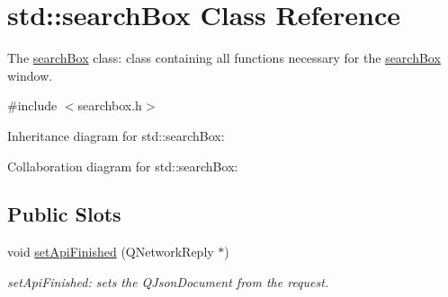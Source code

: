 \hypertarget{classstd_1_1searchBox}{}\section{std\+:\+:search\+Box Class Reference}
\label{classstd_1_1searchBox}


The \hyperlink{classstd_1_1searchBox}{search\+Box} class\+: class containing all functions necessary for the \hyperlink{classstd_1_1searchBox}{search\+Box} window.  




{\ttfamily \#include $<$searchbox.\+h$>$}



Inheritance diagram for std\+:\+:search\+Box\+:


Collaboration diagram for std\+:\+:search\+Box\+:
\subsection*{Public Slots}
\begin{DoxyCompactItemize}
\item 
void \hyperlink{classstd_1_1searchBox_ae809f6492d5745373277ec26009fa299}{set\+Api\+Finished} (Q\+Network\+Reply $\ast$)
\begin{DoxyCompactList}\small\item\em set\+Api\+Finished\+: sets the Q\+Json\+Document from the request. \end{DoxyCompactList}\end{DoxyCompactItemize}
